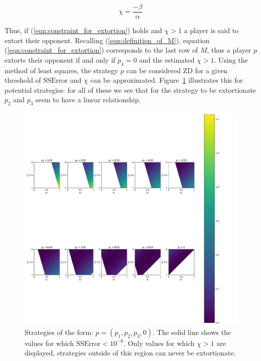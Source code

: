 \documentclass[a4paper]{article}
\begin{document}
\begin{equation}\label{eqn:definition_of_chi}
    \chi=\frac{-\beta}{\alpha}
\end{equation}

Thus, if (\ref{eqn:constraint_for_extortion}) holds and \(\chi >1\) a player is
said to extort their opponent. Recalling (\ref{eqn:definition_of_M}), equation
(\ref{eqn:constraint_for_extortion}) corresponds to the last row of \(M\), thus
a player \(p\) extorts their opponent if and only if \(p_4=0\) and the estimated
\(\chi > 1\). Using the method of least squares, the strategy \(p\) can be
considered ZD for a given threshold of \(\text{SSError}\) and \(\chi\) can be
approximated.  Figure~\ref{fig:examples_of_extortion} illustrates this for
potential strategies: for all of these we see that for the strategy to be
extortionate \(p_2\) and \(p_3\) seem to have a linear relationship.

\begin{figure}[!htbp]
    \begin{center}
        \includegraphics[width=\textwidth]{assets/img/examples_of_extortion/main.pdf}
        \caption{Strategies of the form:
                 \(p=(p_1, p_2, p_3, 0)\). The solid line shows the values for
                 which \(\text{SSError} < 10 ^ {-6}\). Only values for which \(\chi > 1\) are
                 displayed, strategies outside of this region can never be
                 extortionate.}
        \label{fig:examples_of_extortion}
    \end{center}
\end{figure}
\end{document}
